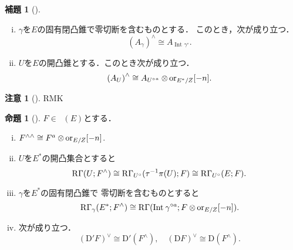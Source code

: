 \documentclass[uplatex,dvipdfmx,a4paper,10pt,draft]{jsarticle}
\theoremstyle{definition}
\newcommand{\rr}{\mathbf{R}}
\numberwithin{equation}{section}
\newcommand{\RG}{\mathop{\mathrm{R}\hspace{-0pt}\Gamma}\nolimits}
\newcommand{\rmD}{\mathrm{D}}
\newcommand{\ori}{\mathord{\mathrm{or}}}
\newcommand{\tens}[1][]{\mathbin{\otimes_{\raise1.5ex\hbox to-.1em{}{#1}}}}
\theoremstyle{mystyle}
\newtheorem{mylmm}[mythm]{補題}
\newtheorem{myprp}[mythm]{命題}
\newtheorem{RMK}[mythm]{注意}
\newenvironment{lmm}{\begin{lmmbox}\begin{mylmm}}{\end{mylmm}\end{lmmbox}}
\newenvironment{prp}{\begin{prpbox}\begin{myprp}}{\end{myprp}\end{prpbox}}
\newcommand{\Dlcon}{\mathop{\mathsf{D}^{+}_{\rr_{>0}}}\nolimits}
\newcommand{\Int}[1][]{\mathop{\mathrm{Int}}\nolimits_{#1}}
\begin{document}
\begin{lmm}[{\cite[Lemma 3.7.10]{KS90}}]
    \begin{enumerate}[(i)]
        \item \(\gamma\)を\(E\)の固有閉凸錐で零切断を含むものとする．
        このとき，次が成り立つ．\[
            \left(A_\gamma\right)^\wedge
            \cong A_{\Int{\gamma^\circ}}.
        \]
        \item \(U\)を\(E\)の開凸錐とする．このとき次が成り立つ．
        \[
            \left(A_U\right)^\wedge\cong
            A_{{U^{\circ}}^a}\tens \ori_{E^\ast/Z}[-n].
        \]
    \end{enumerate}
\end{lmm}
\begin{RMK}[{\cite[Remark 3.7.11]{KS90}}]
    RMK
\end{RMK}
\begin{prp}[{\cite[Proposition 3.7.12]{KS90}}]
    \(F\in\Dlcon(E)\)とする．
    \begin{enumerate}[(i)]
        \item \(F^{\wedge\wedge}\cong F^a\tens \ori_{E/Z}[-n]\).
        \item \(U\)を\(E^\ast\)の開凸集合とすると\[
            \RG(U;F^\wedge)
            \cong\RG_{U^\circ}(\tau^{-1}\pi(U);F)
            \cong\RG_{U^\circ}(E;F).
        \]
        \item \(\gamma\)を\(E^\ast\)の固有閉凸錐で
        零切断を含むものとすると\[
            \RG_{\gamma}(E^\ast;F^\wedge)
            \cong
            \RG(\Int{\gamma^{\circ a}};F\tens\ori_{E/Z}[-n]).
        \]
        \item 次が成り立つ．\[
            \left(\rmD'F\right)^\vee\cong\rmD'(F^\wedge),
            \quad
            \left(\rmD F\right)^\vee\cong\rmD(F^\wedge).
            \]
    \end{enumerate}
\end{prp}
\end{document}
